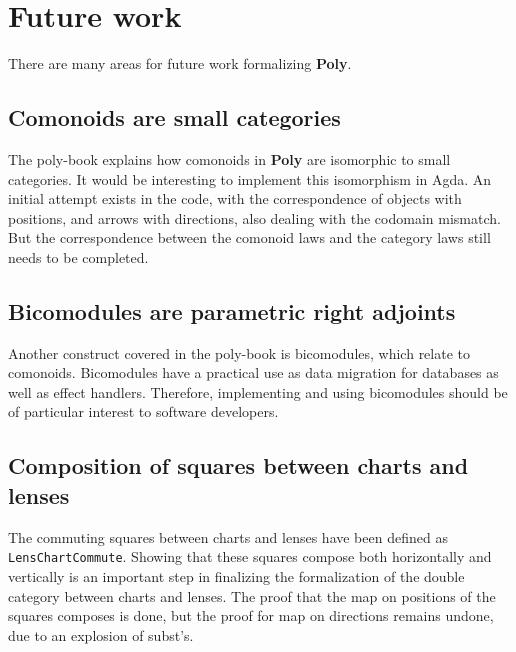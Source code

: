


\section{Future work}
There are many areas for future work formalizing \textbf{Poly}. 

\subsection{Comonoids are small categories}
The poly-book explains how comonoids in \textbf{Poly} are isomorphic to small categories. It would be interesting to implement this isomorphism in Agda. An initial attempt exists in the code, with the correspondence of objects with positions, and arrows with directions, also dealing with the codomain mismatch. But the correspondence between the comonoid laws and the category laws still needs to be completed.

\subsection{Bicomodules are parametric right adjoints}
Another construct covered in the poly-book is bicomodules, which relate to comonoids. Bicomodules have a practical use as data migration for databases \cite{bicomodulesBlog} as well as effect handlers. Therefore, implementing and using bicomodules should be of particular interest to software developers.

\subsection{Composition of squares between charts and lenses} \label{section:commutingSquaresCompose}
The commuting squares between charts and lenses have been defined as \texttt{LensChartCommute}. Showing that these squares compose both horizontally and vertically is an important step in finalizing the formalization of the double category between charts and lenses. The proof that the map on positions of the squares composes is done, but the proof for map on directions remains undone, due to an explosion of subst's.

